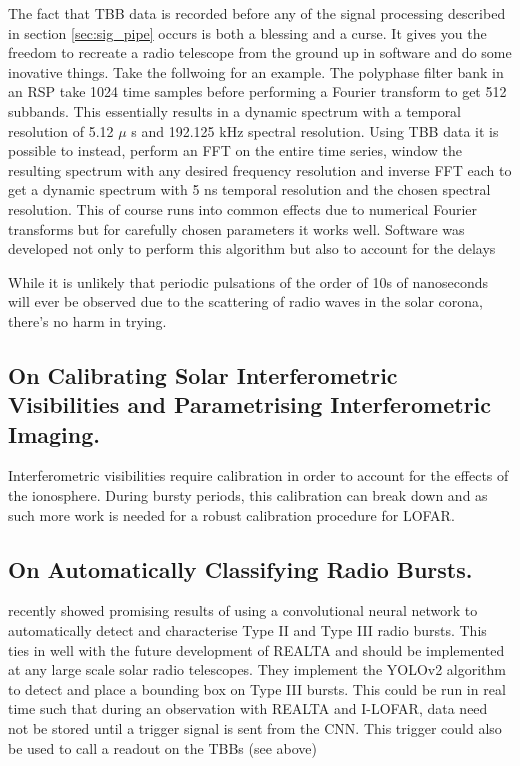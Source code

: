 The fact that TBB data is recorded before any of the signal processing described in section \ref{sec:sig_pipe} occurs is both a blessing and a curse. It gives you the freedom to recreate a radio telescope from the ground up in software and do some inovative things. Take the follwoing for an example. The polyphase filter bank in an RSP take 1024 time samples before performing a Fourier transform to get 512 subbands. This essentially results in a dynamic spectrum with a temporal resolution of 5.12 $\mu$ s and 192.125 kHz spectral resolution. Using TBB data it is possible to instead, perform an FFT on the entire time series, window the resulting spectrum with any desired frequency resolution and inverse FFT each to get a dynamic spectrum with 5 ns temporal resolution and the chosen spectral resolution. This of course runs into common effects due to numerical Fourier transforms but for carefully chosen parameters it works well. Software was developed not only to perform this algorithm but also to account for the delays 


While it is unlikely that periodic pulsations of the order of 10s of nanoseconds will ever be observed due to the scattering of radio waves in the solar corona, there's no harm in trying.

\subsection{On Calibrating Solar Interferometric Visibilities and Parametrising Interferometric Imaging.}
Interferometric visibilities require calibration in order to account for the effects of the ionosphere. During bursty periods, this calibration can break down and as such more work is needed for a robust calibration procedure for LOFAR.

\subsection{On Automatically Classifying Radio Bursts.}
\cite{Scully2021} recently showed promising results of using a convolutional neural network to automatically detect and characterise Type II and Type III radio bursts. This ties in well with the future development of REALTA and should be implemented at any large scale solar radio telescopes. They implement the YOLOv2 algorithm to detect and place a bounding box on Type III bursts. This could be run in real time such that during an observation with REALTA and I-LOFAR, data need not be stored until a trigger signal is sent from the CNN. This trigger could also be used to call a readout on the TBBs (see above)

